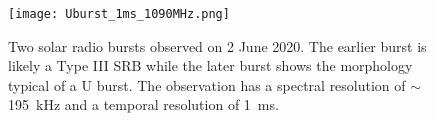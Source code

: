 \begin{figure}[ht]
    \centering
    \texttt{[image: Uburst\_1ms\_1090MHz.png]}
    \caption[Two solar radio bursts observed on 2 June 2020.]{Two solar radio bursts observed on 2 June 2020. The earlier burst is likely a Type III SRB while the later burst shows the morphology typical of a U burst. The observation has a spectral resolution of $\sim$ \SI{195}{\kilo \hertz} and a temporal resolution of \SI{1}{\milli \second}.}
    \label{fig:uburst}
\end{figure}

%
%
%
